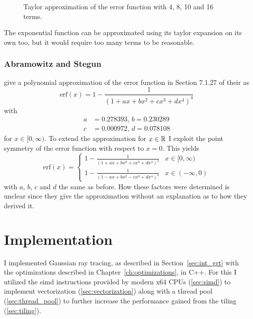 \documentclass[a4paper, 11pt]{memoir}
\newcommand*{\erf}{\text{erf}}
\begin{document}
    \begin{figure}[t]
        \centering
        
        \caption{Taylor approximation of the error function with 4, 8, 10 and 16 terms.}
        \label{fig:taylor_erf}
    \end{figure}

    The exponential function can be approximated using its taylor expansion on its own too, but it would require too
    many terms to be reasonable.

    \subsection{Abramowitz and Stegun}
    \label{sec:abrasteg}
    \citeauthor{AbraSteg72} give a polynomial approximation of the error function in Section 7.1.27 of their
    \cite{AbraSteg72} as
    \begin{equation}
        \erf{(x)} = 1 - \frac{1}{(1 + ax + bx^2 + cx^3 + dx^4)^4}
        \label{eq:abrasteg_positive}
    \end{equation}
    with
    \begin{equation}
        \begin{aligned}
            a &= 0.278393,\,
            b = 0.230289\\
            c &= 0.000972,\,
            d = 0.078108
        \end{aligned}
        \label{eq:abrasteg_defs}
    \end{equation}
    for $x \in [0, \infty)$. To extend the approximation for $x \in \mathbb{R}$ I exploit the point symmetry of the error function
    with respect to $x = 0$. This yields
    \begin{equation}
        \erf{(x)} = \begin{cases}
            1 - \frac{1}{(1 + ax + bx^2 + cx^3 + dx^4)^4} & x \in [0, \infty)\\
            1 - \frac{1}{(1 - ax + bx^2 - cx^3 + dx^4)^4} & x \in (-\infty, 0)
        \end{cases}
        \label{eq:abrasteg}
    \end{equation}
    with $a$, $b$, $c$ and $d$ the same as before. How these factors were determined is unclear since they give the
    approximation without an explanation as to how they derived it.
    
    \chapter{Implementation}
    \label{ch:implementation}
    I implemented Gaussian ray tracing, as described in Section~\ref{sec:int_grt} with the optimizations described in
    Chapter~\ref{ch:optimizations}, in C++. For this I utilized the \gls{simd} instructions provided by modern x64 CPUs
    (\ref{sec:simd}) to implement vectorization (\ref{sec:vectorization}) along with a thread pool
    (\ref{sec:thread_pool}) to further increase the performance gained from the tiling (\ref{sec:tiling}).
\end{document}
